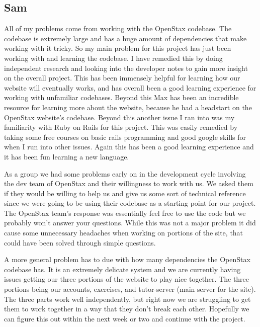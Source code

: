 \documentclass[onecolumn, draftclsnofoot,10pt, compsoc]{IEEEtran}
\begin{document}
\subsection{Sam}
All of my problems come from working with the OpenStax codebase. The codebase is extremely large and has a huge amount of dependencies that make working with it tricky. So my main problem for this project has just been working with and learning the codebase. I have remedied this by doing independent research and looking into the developer notes to gain more insight on the overall project. This has been immensely helpful for learning how our website will eventually works, and has overall been a good learning experience for working with unfamiliar codebases. Beyond this Max has been an incredible resource for learning more about the website, because he had a headstart on the OpenStax website’s codebase. Beyond this another issue I ran into was my familiarity with Ruby on Rails for this project. This was easily remedied by taking some free courses on basic rails programming and good google skills for when I run into other issues. Again this has been a good learning experience and it has been fun learning a new language. 

As a group we had some problems early on in the development cycle involving the dev team of OpenStax and their willingness to work with us. We asked them if they would be willing to help us and give us some sort of technical reference since we were going to be using their codebase as a starting point for our project. The OpenStax team’s response was essentially feel free to use the code but we probably won’t answer your questions. While this was not a major problem it did cause some unnecessary headaches when working on portions of the site, that could have been solved through simple questions.

 A more general problem has to due with how many dependencies the OpenStax codebase has. It is an extremely delicate system and we are currently having issues getting our three portions of the website to play nice together. The three portions being our accounts, exercises, and tutor-server (main server for the site). The three parts work well independently, but right now we are struggling to get them to work together in a way that they don’t break each other. Hopefully we can figure this out within the next week or two and continue with the project. 
 
\end{document}
